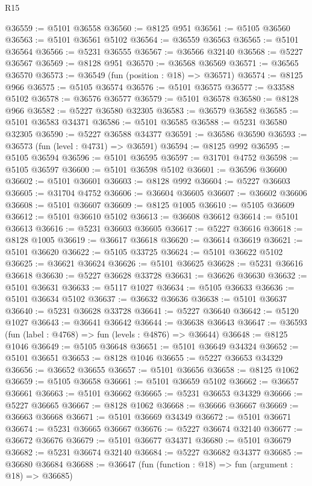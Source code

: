 \begin{lexlean}{R15}
\begin{coremodule}
{{{{{{{{{{{@36559 := @5101 @36558
@36560 := @8125 @951
@36561 := @5105 @36560
@36563 := @5101 @36561 @5102
@36564 := @36559 @36563
@36565 := @5101 @36564
@36566 := @5231 @36555
@36567 := @36566 @32140
@36568 := @5227 @36567
@36569 := @8128 @951
@36570 := @36568 @36569
@36571 := @36565 @36570
@36573 := @36549 (fun (position : @18) => @36571)
@36574 := @8125 @966
@36575 := @5105 @36574
@36576 := @5101 @36575
@36577 := @33588 @5102
@36578 := @36576 @36577
@36579 := @5101 @36578
@36580 := @8128 @966
@36582 := @5227 @36580 @32305
@36583 := @36579 @36582
@36585 := @5101 @36583 @34371
@36586 := @5101 @36585
@36588 := @5231 @36580 @32305
@36590 := @5227 @36588 @34377
@36591 := @36586 @36590
@36593 := @36573 (fun (level : @4731) => @36591)
@36594 := @8125 @992
@36595 := @5105 @36594
@36596 := @5101 @36595
@36597 := @31701 @4752
@36598 := @5105 @36597
@36600 := @5101 @36598 @5102
@36601 := @36596 @36600
@36602 := @5101 @36601
@36603 := @8128 @992
@36604 := @5227 @36603
@36605 := @31704 @4752
@36606 := @36604 @36605
@36607 := @36602 @36606
@36608 := @5101 @36607
@36609 := @8125 @1005
@36610 := @5105 @36609
@36612 := @5101 @36610 @5102
@36613 := @36608 @36612
@36614 := @5101 @36613
@36616 := @5231 @36603 @36605
@36617 := @5227 @36616
@36618 := @8128 @1005
@36619 := @36617 @36618
@36620 := @36614 @36619
@36621 := @5101 @36620
@36622 := @5105 @33725
@36624 := @5101 @36622 @5102
@36625 := @36621 @36624
@36626 := @5101 @36625
@36628 := @5231 @36616 @36618
@36630 := @5227 @36628 @33728
@36631 := @36626 @36630
@36632 := @5101 @36631
@36633 := @5117 @1027
@36634 := @5105 @36633
@36636 := @5101 @36634 @5102
@36637 := @36632 @36636
@36638 := @5101 @36637
@36640 := @5231 @36628 @33728
@36641 := @5227 @36640
@36642 := @5120 @1027
@36643 := @36641 @36642
@36644 := @36638 @36643
@36647 := @36593 (fun (label : @4768) => fun (levels : @4876) => @36644)
@36648 := @8125 @1046
@36649 := @5105 @36648
@36651 := @5101 @36649 @34324
@36652 := @5101 @36651
@36653 := @8128 @1046
@36655 := @5227 @36653 @34329
@36656 := @36652 @36655
@36657 := @5101 @36656
@36658 := @8125 @1062
@36659 := @5105 @36658
@36661 := @5101 @36659 @5102
@36662 := @36657 @36661
@36663 := @5101 @36662
@36665 := @5231 @36653 @34329
@36666 := @5227 @36665
@36667 := @8128 @1062
@36668 := @36666 @36667
@36669 := @36663 @36668
@36671 := @5101 @36669 @34349
@36672 := @5101 @36671
@36674 := @5231 @36665 @36667
@36676 := @5227 @36674 @32140
@36677 := @36672 @36676
@36679 := @5101 @36677 @34371
@36680 := @5101 @36679
@36682 := @5231 @36674 @32140
@36684 := @5227 @36682 @34377
@36685 := @36680 @36684
@36688 := @36647 (fun (function : @18) => fun (argument : @18) => @36685)
}}}}}}}}}}}
\end{coremodule}
\end{lexlean}
